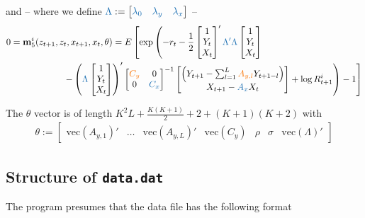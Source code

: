 \documentclass[11pt, letterpaper, notitlepage]{article}
\begin{document}
and -- where we define $\textcolor{blue}{\Lambda} := \begin{bmatrix} 
\textcolor{blue}{\lambda_0} & \textcolor{blue}{\lambda_y} & \textcolor{blue}{\lambda_x} 
\end{bmatrix}$ --
\begin{align*}
0 &= \mathbf{m}^i_{5}(z_{t+1}, z_t, x_{t+1}, x_t, \theta) = E\left[\exp\left(-r_t - \frac{1}{2}\begin{bmatrix}
1 \\ Y_t \\ X_t
\end{bmatrix}'\textcolor{blue}{\Lambda'\Lambda}\begin{bmatrix}
1 \\ Y_t \\ X_t
\end{bmatrix} \right.\right.\\ 
&\left.\left.\hspace{2cm}- \left(\textcolor{blue}{\Lambda}\begin{bmatrix}
1 \\ Y_t \\ X_t
\end{bmatrix}\right)'\begin{bmatrix} 
\textcolor{orange}{C_y} & 0\\ 0 & \textcolor{blue}{C_x}
\end{bmatrix}^{-1}\begin{bmatrix}
\left(Y_{t+1} - \sum_{l=1}^{L}\textcolor{orange}{A_{y, l}} Y_{t+1-l}\right)\\
X_{t+1}-\textcolor{blue}{A_x} X_t
\end{bmatrix} + \log R^i_{t+1} \right) - 1 \right]
\end{align*} 

The $\theta$ vector is of length $K^2L + \frac{K(K+1)}{2} + 2 + (K+1)(K+2)$ with 
\begin{align*}
\theta :=\begin{bmatrix}
 \text{vec}\left(A_{y, 1}\right)' & \dots & \text{vec}\left(A_{y, L}\right)' & \text{vec}\left(C_y\right) & \rho & \sigma & \text{vec}\left(\Lambda\right)'
\end{bmatrix}
\end{align*}

\subsection{Structure of \texttt{data.dat}}

The program presumes that the data file has the following format
\end{document}
